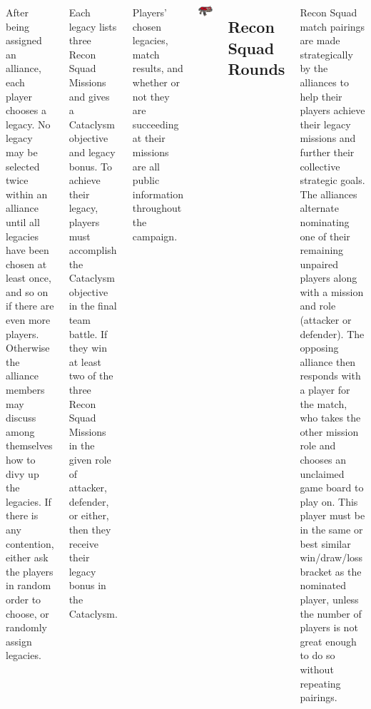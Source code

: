 \begin{columns}
After being assigned an alliance, each player chooses a legacy.  No
legacy may be selected twice within an alliance until all legacies
have been chosen at least once, and so on if there are even more
players.  Otherwise the alliance members may discuss among themselves
how to divy up the legacies.  If there is any contention, either ask
the players in random order to choose, or randomly assign legacies.

Each legacy lists three Recon Squad Missions and gives a Cataclysm
objective and legacy bonus.  To achieve their legacy, players must
accomplish the Cataclysm objective in the final team battle.  If they
win at least two of the three Recon Squad Missions in the given role
of attacker, defender, or either, then they receive their legacy bonus
in the Cataclysm.

Players' chosen legacies, match results, and whether or not they are
succeeding at their missions are all public information throughout the
campaign.

\vfill
\centerline{\includegraphics[width=0.8\linewidth]{art/bolter/boltgun}}

\subsection{Recon Squad Rounds}

Recon Squad match pairings are made strategically by the alliances to
help their players achieve their legacy missions and further their
collective strategic goals.  The alliances alternate nominating one of
their remaining unpaired players along with a mission and role
(attacker or defender).  The opposing alliance then responds with a
player for the match, who takes the other mission role and chooses an
unclaimed game board to play on.  This player must be in the same or
best similar win/draw/loss bracket as the nominated player, unless the
number of players is not great enough to do so without
repeating pairings.


\end{columns}
